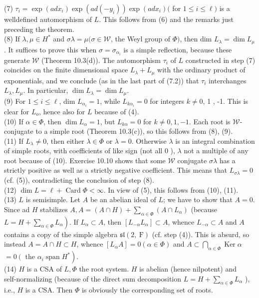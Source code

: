 \documentclass[10pt]{article}
\begin{document}
(7) $\tau_{i}=\exp \left(a d x_{i}\right) \exp \left(a d\left(-y_{i}\right)\right) \exp \left(a d x_{i}\right)($ for $1 \leq i \leq \ell)$ is a welldefined automorphism of $L$. This follows from (6) and the remarks just preceding the theorem.\\
(8) If $\lambda, \mu \in H^{*}$ and $\sigma \lambda=\mu(\sigma \in \mathscr{W}$, the Weyl group of $\Phi)$, then dim $L_{\lambda}=\operatorname{dim} L_{\mu}$. It suffices to prove this when $\sigma=\sigma_{\alpha_{i}}$ is a simple reflection, because these generate $\mathscr{W}$ (Theorem 10.3(d)). The automorphism $\tau_{i}$ of $L$ constructed in step (7) coincides on the finite dimensional space $L_{\lambda}+L_{\mu}$ with the ordinary product of exponentials, and we conclude (as in the last part of (7.2)) that $\tau_{i}$ interchanges $L_{\lambda}, L_{\mu}$. In particular, $\operatorname{dim} L_{\lambda}=\operatorname{dim} L_{\mu}$.\\
(9) For $1 \leq i \leq \ell$, dim $L_{\alpha_{i}}=1$, while $L_{k \alpha_{i}}=0$ for integers $k \neq 0$, 1 , -1. This is clear for $L_{o}$, hence also for $L$ because of (4).\\
(10) If $\alpha \in \Phi$, then $\operatorname{dim} L_{\alpha}=1$, but $L_{k \alpha}=0$ for $k \neq 0,1,-1$. Each root is $\mathscr{W}$-conjugate to a simple root (Theorem 10.3(c)), so this follows from (8), (9).\\
(11) If $L_{\lambda} \neq 0$, then either $\lambda \in \Phi$ or $\lambda=0$. Otherwise $\lambda$ is an integral combination of simple roots, with coefficients of like sign (not all 0 ), $\lambda$ not a multiple of any root because of (10). Exercise 10.10 shows that some $\mathscr{W}$ conjugate $\sigma \lambda$ has a strictly positive as well as a strictly negative coefficient. This means that $L_{\sigma \lambda}=0$ (cf. (5)), contradicting the conclusion of step (8).\\
(12) $\operatorname{dim} L=\ell+\operatorname{Card} \Phi<\infty$. In view of (5), this follows from (10), (11).\\
(13) $L$ is semisimple. Let $A$ be an abelian ideal of $L$; we have to show that $A=0$. Since ad $H$ stabilizes $A, A=(A \cap H)+\sum_{\alpha \in \Phi}\left(A \cap L_{\alpha}\right)$ (because $\left.L=H+\sum_{\alpha \in \Phi} L_{\alpha}\right)$. If $L_{\alpha} \subset A$, then $\left[L_{-\alpha} L_{\alpha}\right] \subset A$, whence $L_{-\alpha} \subset A$ and $A$ contains a copy of the simple algebra $\mathfrak{s l}(2, \mathrm{~F})$ (cf. step (4)). This is absurd, so instead $A=A \cap H \subset H$, whence $\left[L_{\alpha} A\right]=0(\alpha \in \Phi)$ and $A \subset \bigcap_{\alpha \in \Phi} \operatorname{Ker} \alpha$ $=0\left(\right.$ the $\left.\alpha_{i} \operatorname{span} H^{*}\right)$.\\
(14) $H$ is a CSA of $L, \Phi$ the root system. $H$ is abelian (hence nilpotent) and\\
self-normalizing (because of the direct sum decomposition $L=H+\sum_{\alpha \in \Phi} L_{\alpha}$ ), i.e., $H$ is a CSA. Then $\Phi$ is obviously the corresponding set of roots.
\end{document}
